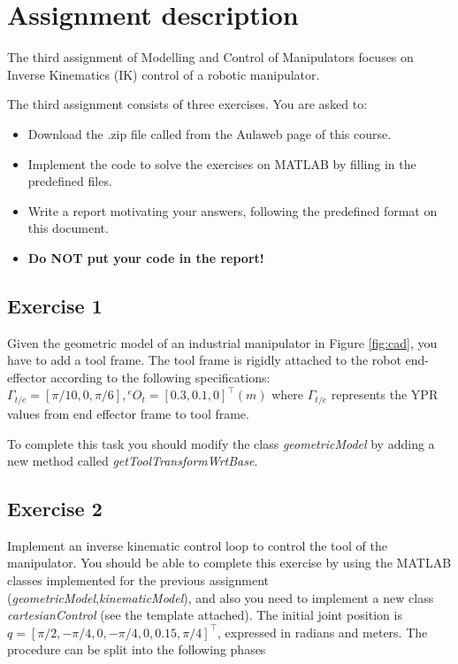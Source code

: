 \section{Assignment description}
The third assignment of Modelling and Control of Manipulators focuses on Inverse Kinematics (IK) control of a robotic manipulator.

The third assignment consists of three exercises. You are asked to:
\begin{itemize}
    \item Download the .zip file called from the Aulaweb page of this course.
    \item Implement the code to solve the exercises on MATLAB by filling in the predefined files.
    \item Write a report motivating your answers, following the predefined format on this document.
    \item \textbf{Do NOT put your code in the report!}
\end{itemize}

\subsection{Exercise 1}

Given the geometric model of an industrial manipulator in Figure \ref{fig:cad}, you have to add a tool frame.
The tool frame is rigidly attached to the robot end-effector according to the following specifications: $ \Gamma_{t/e}=[\pi/10,0,\pi/6], {}^eO_t=[0.3,0.1,0]^{\top}(m)$ 
where $\Gamma_{t/e}$ represents the YPR values from end effector frame to tool frame.

To complete this task you should modify the class \textit{geometricModel} by adding a new method called \textit{getToolTransformWrtBase}.

\subsection{Exercise 2}

Implement an inverse kinematic control loop to control the tool of the manipulator. You should be able to complete this exercise by using the MATLAB classes implemented for the previous assignment (\textit{geometricModel},\textit{kinematicModel}), and also you need to implement a new class \textit{cartesianControl} (see the template attached).
The initial joint position is $q = [\pi/2, -\pi/4, 0, -\pi/4, 0, 0.15, \pi/4]^{\top}$, expressed in radians and meters.
The procedure can be split into the following phases

